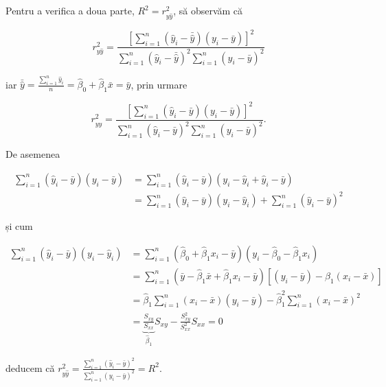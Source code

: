 \documentclass[]{article}
\begin{document}
Pentru a verifica a doua parte, \(R^2 = r_{y\hat y}^2\), să observăm că

\[
r_{y\hat y}^2 = \frac{\left[\sum_{i = 1}^{n}(\hat y_i - \bar{\hat y})(y_i - \bar y)\right]^2}{\sum_{i = 1}^{n}(\hat y_i - \bar{\hat y})^2\sum_{i = 1}^{n}(y_i - \bar y)^2}
\]

iar
\(\bar{\hat y} = \frac{\sum_{i = 1}^{n}\hat y_i}{n} = \hat \beta_0 + \hat\beta_1 \bar x = \bar y\),
prin urmare

\[
r_{y\hat y}^2 = \frac{\left[\sum_{i = 1}^{n}(\hat y_i - \bar{y})(y_i - \bar y)\right]^2}{\sum_{i = 1}^{n}(\hat y_i - \bar{y})^2\sum_{i = 1}^{n}(y_i - \bar y)^2}.
\]

De asemenea

\begin{align*}
\sum_{i = 1}^{n}(\hat y_i - \bar{y})(y_i - \bar y) &= \sum_{i = 1}^{n}(\hat y_i - \bar{y})(y_i - \hat y_i + \hat y_i - \bar y) \\
 &= \sum_{i = 1}^{n}(\hat y_i - \bar{y})(y_i - \hat y_i) + \sum_{i = 1}^{n}(\hat y_i - \bar{y})^2
\end{align*}

și cum

\begin{align*}
\sum_{i = 1}^{n}(\hat y_i - \bar{y})(y_i - \hat y_i) &= \sum_{i = 1}^{n}(\hat \beta_0 + \hat\beta_1 x_i - \bar{y})(y_i - \hat \beta_0 - \hat\beta_1 x_i) \\
  &= \sum_{i = 1}^{n}(\bar y - \hat\beta_1 \bar x + \hat\beta_1 x_i - \bar{y})[(y_i - \bar y ) - \hat\beta_1 (x_i - \bar x)]\\
  &= \hat\beta_1 \sum_{i = 1}^{n}(x_i - \bar x)(y_i - \bar y) - \hat\beta_1^2 \sum_{i = 1}^{n}(x_i - \bar x)^2 \\
  &= \underbrace{\frac{S_{xy}}{S_{xx}}}_{\hat\beta_1}S_{xy} - \frac{S_{xy}^2}{S_{xx}^2}S_{xx} = 0
\end{align*}

deducem că
\(r_{y\hat y}^2 = \frac{\sum_{i = 1}^{n}(\hat y_i - \bar{y})^2}{\sum_{i = 1}^{n}(y_i - \bar y)^2} = R^2\).


\end{document}
